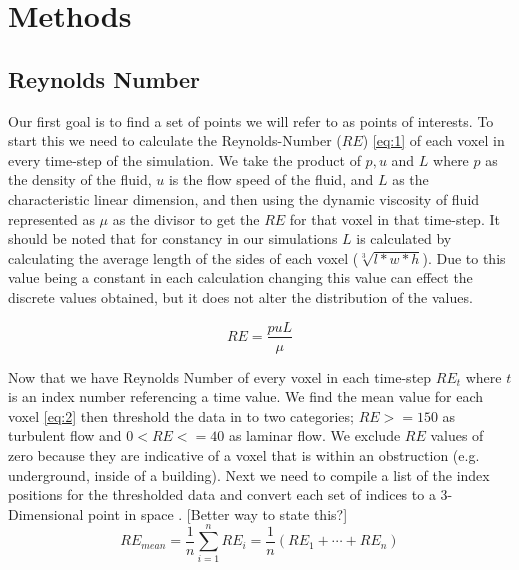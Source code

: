 
\chapter{Methods} %

\label{Chapter2} %


\section{Reynolds Number}

Our first goal is to find a set of points we will refer to as points of interests. To start this we need to calculate the Reynolds-Number (\ensuremath{RE}) \ref{eq:1} of each voxel in every time-step of the simulation.
We take the product of  \ensuremath{p,u} and \ensuremath{L} where \ensuremath{p} as the density of the fluid, \ensuremath{u} is the flow speed of the fluid, and \ensuremath{L} as the characteristic linear dimension, and then using the dynamic viscosity of fluid represented as $\mu$ as the divisor to get the \ensuremath{RE} for that voxel in that time-step. It should be noted that for constancy in our simulations \ensuremath{L} is calculated by calculating the average length of the sides of each voxel  (\ensuremath{\sqrt[3]{l*w*h}}). Due to this value being a constant in each calculation changing this value can effect the discrete values obtained, but it does not alter the distribution of the values. 

\begin{equation}\label{eq:1}
RE  = \frac{puL} {\mu} 
\end{equation}

Now that we have Reynolds Number of every voxel in each time-step \ensuremath{RE_t} where \ensuremath{t} is an index number referencing a time value.  We find the mean value for each voxel \ref{eq:2} then threshold the data in to two categories; \ensuremath{RE>=150} as turbulent flow and \ensuremath{0<RE<=40}  as laminar flow. We exclude \ensuremath{RE} values of zero because they are indicative of a voxel  that is within an obstruction (e.g. underground, inside of a building). Next we need to compile a list of the index positions for the thresholded data and convert each set of indices to a 3-Dimensional point in space . \color{red} [Better way to state this?] \color{black} 
\begin{equation} \label{eq:2}
RE_{mean} = \frac{1}{n} \sum_{i=1}^{n} RE_{i}=\frac{1}{n}\left(RE_{1}+\cdots+RE_{n}\right)
\end{equation} 

